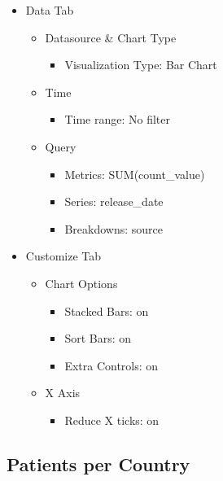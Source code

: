 \documentclass[
]{book}
\providecommand{\tightlist}{%
  \setlength{\itemsep}{0pt}\setlength{\parskip}{0pt}}
\begin{document}
\begin{itemize}
\tightlist
\item
  Data Tab

  \begin{itemize}
  \tightlist
  \item
    Datasource \& Chart Type

    \begin{itemize}
    \tightlist
    \item
      Visualization Type: Bar Chart
    \end{itemize}
  \item
    Time

    \begin{itemize}
    \tightlist
    \item
      Time range: No filter
    \end{itemize}
  \item
    Query

    \begin{itemize}
    \tightlist
    \item
      Metrics: SUM(count\_value)
    \item
      Series: release\_date
    \item
      Breakdowns: source
    \end{itemize}
  \end{itemize}
\item
  Customize Tab

  \begin{itemize}
  \tightlist
  \item
    Chart Options

    \begin{itemize}
    \tightlist
    \item
      Stacked Bars: on
    \item
      Sort Bars: on
    \item
      Extra Controls: on
    \end{itemize}
  \item
    X Axis

    \begin{itemize}
    \tightlist
    \item
      Reduce X ticks: on
    \end{itemize}
  \end{itemize}
\end{itemize}

\hypertarget{patients-per-country}{%
\subsection*{Patients per Country}\label{patients-per-country}}
\end{document}
